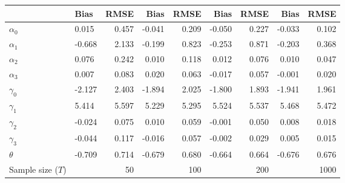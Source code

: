 
\begin{tabular}[t]{llrrrrrrr}
\toprule
  & Bias & RMSE & Bias & RMSE & Bias & RMSE & Bias & RMSE\\
\midrule
$\alpha_{0}$ & 0.015 & 0.457 & -0.041 & 0.209 & -0.050 & 0.227 & -0.033 & 0.102\\
$\alpha_{1}$ & -0.668 & 2.133 & -0.199 & 0.823 & -0.253 & 0.871 & -0.203 & 0.368\\
$\alpha_{2}$ & 0.076 & 0.242 & 0.010 & 0.118 & 0.012 & 0.076 & 0.010 & 0.047\\
$\alpha_{3}$ & 0.007 & 0.083 & 0.020 & 0.063 & -0.017 & 0.057 & -0.001 & 0.020\\
$\gamma_{0}$ & -2.127 & 2.403 & -1.894 & 2.025 & -1.800 & 1.893 & -1.941 & 1.961\\
$\gamma_{1}$ & 5.414 & 5.597 & 5.229 & 5.295 & 5.524 & 5.537 & 5.468 & 5.472\\
$\gamma_{2}$ & -0.024 & 0.075 & 0.010 & 0.059 & -0.001 & 0.050 & 0.008 & 0.018\\
$\gamma_{3}$ & -0.044 & 0.117 & -0.016 & 0.057 & -0.002 & 0.029 & 0.005 & 0.015\\
$\theta$ & -0.709 & 0.714 & -0.679 & 0.680 & -0.664 & 0.664 & -0.676 & 0.676\\
Sample size ($T$) &  & 50 &  & 100 &  & 200 &  & 1000\\
\bottomrule
\end{tabular}
